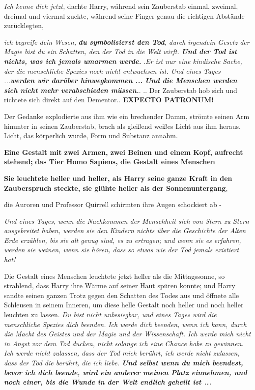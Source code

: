\emph{Ich kenne dich jetzt,} dachte Harry, während sein Zauberstab einmal,
zweimal, dreimal und viermal zuckte, während seine Finger genau die richtigen
Abstände zurücklegten,

\emph{ich begreife dein Wesen,} \textbf{\emph{du symbolisierst den Tod}}\emph{,}
\emph{durch irgendein Gesetz der Magie bist du ein Schatten, den der Tod in die
Welt wirft.} \textbf{\emph{ Und der Tod ist nichts, was ich jemals umarmen
werde.} } \grqq{}.\emph{Er ist nur eine kindische Sache, der die menschliche
Spezies noch nicht entwachsen ist. Und eines Tages ...}\textbf{\emph{werden wir
darüber hinwegkommen ...} } \textbf{\emph{Und die Menschen werden sich nicht mehr
verabschieden müssen.}}\grqq{}. .. Der Zauberstab hob sich und richtete sich
direkt auf den Dementor.\grqq{}. \textbf{ \glqq{}EXPECTO PATRONUM!}\grqq{}

Der Gedanke explodierte aus ihm wie ein brechender Damm, strömte seinen Arm
hinunter in seinen Zauberstab, brach als gleißend weißes Licht aus ihm heraus.
Licht, das körperlich wurde, Form und Substanz annahm.


\textbf{Eine Gestalt mit zwei Armen, zwei Beinen und einem Kopf, aufrecht
stehend;} \textbf{das Tier Homo Sapiens, die Gestalt eines Menschen}

\textbf{Sie leuchtete heller und heller, als Harry seine ganze Kraft in den
Zauberspruch steckte, sie glühte heller als der Sonnenuntergang},

die Auroren und Professor Quirrell schirmten ihre Augen schockiert ab -

\emph{Und eines Tages, wenn die Nachkommen der Menschheit sich von Stern zu
Stern ausgebreitet haben, werden sie den Kindern nichts über die Geschichte der
Alten Erde erzählen, bis sie alt genug sind, es zu ertragen; und wenn sie es
erfahren, werden sie weinen, wenn sie hören, dass so etwas wie der Tod jemals
existiert hat!}

Die Gestalt eines Menschen leuchtete jetzt heller als die Mittagssonne, so
strahlend, dass Harry ihre Wärme auf seiner Haut spüren konnte; und Harry sandte
seinen ganzen Trotz gegen den Schatten des Todes aus und öffnete alle Schleusen
in seinem Inneren, um diese helle Gestalt noch heller und noch heller leuchten
zu lassen. \emph{ Du bist nicht unbesiegbar, und eines Tages wird die
menschliche Spezies dich beenden.} \emph{Ich werde dich beenden, wenn ich kann,
durch die Macht des Geistes und der Magie und der Wissenschaft. Ich werde mich
nicht in Angst vor dem Tod ducken, nicht solange ich eine Chance habe zu
gewinnen. Ich werde nicht zulassen, dass der Tod mich berührt, ich werde nicht
zulassen, dass der Tod die berührt, die ich liebe. \textbf{ Und selbst wenn du
mich beendest, bevor ich dich beende, wird ein anderer meinen Platz einnehmen,
und noch einer, bis die Wunde in der Welt endlich geheilt ist ...} }


